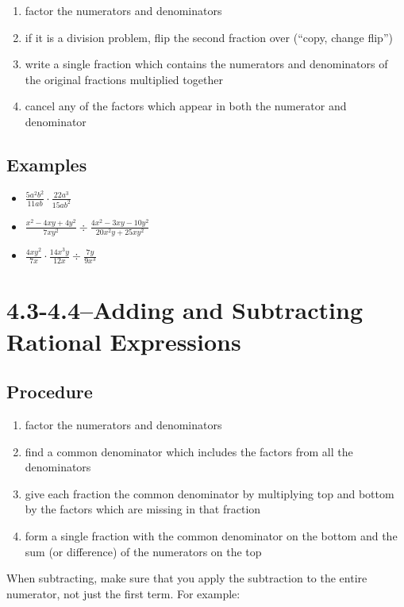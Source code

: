 \documentclass[fleqn,addpoints]{exam}
\begin{document}
\begin{enumerate}
  \item factor the numerators and denominators
  \item if it is a division problem, flip the second fraction over (``copy, change flip'')
  \item write a single fraction which contains the numerators and denominators of the original fractions multiplied together
  \item cancel any of the factors which appear in both the numerator and denominator
\end{enumerate}

\subsection{Examples}
\begin{itemize}
  \item \( \displaystyle \frac{5a^2b^2}{11ab} \cdot \frac{22a^3}{15ab^2} \)
  \item \( \displaystyle \frac{x^2-4xy+4y^2}{7xy^2} \div \frac{4x^2-3xy-10y^2}{20x^2y+25xy^2} \)
  \item \( \displaystyle \frac{4xy^2}{7x} \cdot \frac{14x^3y}{12x} \div \frac{7y}{9x^3} \)
\end{itemize}

\section{4.3-4.4--Adding and Subtracting Rational Expressions}

\subsection{Procedure}

\begin{enumerate}
  \item factor the numerators and denominators
  \item find a common denominator which includes the factors from all the denominators
  \item give each fraction the common denominator by multiplying top and bottom by the factors which are missing in that
    fraction
  \item form a single fraction with the common denominator on the bottom and the sum (or difference) of the numerators
    on the top
\end{enumerate}

When subtracting, make sure that you apply the subtraction to the entire numerator, not just the first term.  For
example:
\end{document}
